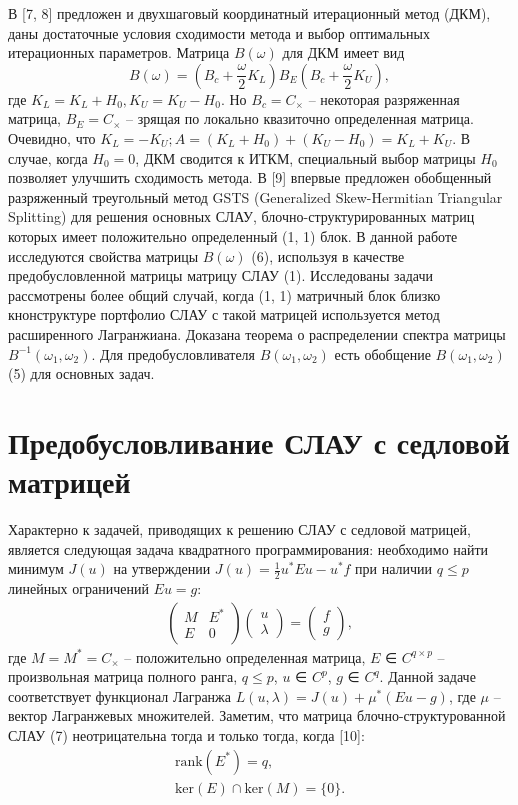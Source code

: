 \documentclass{article}
\begin{document}
В [7, 8] предложен и двухшаговый координатный итерационный метод (ДКМ), даны достаточные условия сходимости метода и выбор оптимальных итерационных параметров. Матрица \( B(\omega) \) для ДКМ имеет вид
\[ B(\omega) = \left(B_c + \frac{\omega}{2} K_L\right)B_E \left(B_c + \frac{\omega}{2} K_U\right), \]
где \( K_L = K_L + H_0, K_U = K_U - H_0 \). Но \( B_c = C_{\times} \) – некоторая разряженная матрица, \( B_E = C_{\times} \) – зрящая по локально квазиточно определенная матрица. Очевидно, что \( K_L = -K_U; A = (K_L + H_0) + (K_U - H_0) = K_L + K_U \). 
В случае, когда \( H_0 = 0 \), ДКМ сводится к ИТКМ, специальный выбор матрицы \( H_0 \) позволяет улучшить сходимость метода.
В [9] впервые предложен обобщенный разряженный треугольный метод GSTS (Generalized Skew-Hermitian Triangular Splitting) для решения основных СЛАУ, блочно-структурированных матриц которых имеет положительно определенный (1, 1) блок.
В данной работе исследуются свойства матрицы \( B(\omega) \) (6), используя в качестве предобусловленной матрицы матрицу СЛАУ (1). Исследованы задачи рассмотрены более общий случай, когда (1, 1) матричный блок близко кнонструктуре портфолио СЛАУ с такой матрицей используется метод расширенного Лагранжиана. Доказана теорема о распределении спектра матрицы \( B^{-1}(\omega_1, \omega_2) \). Для предобусловливателя \( B(\omega_1, \omega_2) \) есть обобщение \( B(\omega_1, \omega_2) \) (5) для основных задач.

\section*{Предобусловливание СЛАУ с седловой матрицей}

Характерно к задачей, приводящих к решению СЛАУ с седловой матрицей, является следующая задача квадратного программирования: необходимо найти минимум \( J(u) \) на утверждении \( J(u) = \frac{1}{2}u^* E u - u^* f \) при наличии \( q \leq p \) линейных ограничений \( E u = g \):
\[
\begin{aligned}
\left( \begin{array}{cc}
M & E^* \\
E & 0 
\end{array} \right)
\left( \begin{array}{c}
u \\
\lambda
\end{array} \right)
= 
\left( \begin{array}{c}
f \\
g
\end{array} \right),
\end{aligned}
\]
где \( M = M^* = C_{\times} \) – положительно определенная матрица, \( E \) ∈ \( C^{q \times p} \) – произвольная матрица полного ранга, \( q \leq p \), \( u \) ∈ \( C^p \), \( g \) ∈ \( C^q \). Данной задаче соответствует функционал Лагранжа \( L(u, \lambda) = J(u) + \mu^* (E u - g) \), где \( \mu \) – вектор Лагранжевых множителей. Заметим, что матрица блочно-структурованной СЛАУ (7) неотрицательна тогда и только тогда, когда [10]:
\[
\begin{aligned}
\text{rank}(E^*) = q, \\
\text{ker}(E) \cap \text{ker}(M) = \{0\}.
\end{aligned}
\]
\end{document}
